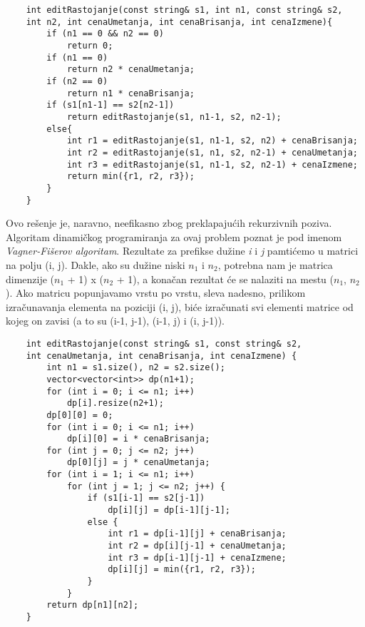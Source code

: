 \documentclass{article}
\begin{document}
\begin{lstlisting}
    int editRastojanje(const string& s1, int n1, const string& s2, 
    int n2, int cenaUmetanja, int cenaBrisanja, int cenaIzmene){
        if (n1 == 0 && n2 == 0)
            return 0;
        if (n1 == 0)
            return n2 * cenaUmetanja;
        if (n2 == 0)
            return n1 * cenaBrisanja;
        if (s1[n1-1] == s2[n2-1])
            return editRastojanje(s1, n1-1, s2, n2-1);
        else{
            int r1 = editRastojanje(s1, n1-1, s2, n2) + cenaBrisanja;
            int r2 = editRastojanje(s1, n1, s2, n2-1) + cenaUmetanja;
            int r3 = editRastojanje(s1, n1-1, s2, n2-1) + cenaIzmene;
            return min({r1, r2, r3});
        }
    }
\end{lstlisting}
Ovo rešenje je, naravno, neefikasno zbog preklapajućih rekurzivnih poziva. Algoritam dinamičkog programiranja za ovaj problem poznat je pod imenom
\textit{Vagner-Fišerov algoritam}. Rezultate za prefikse dužine \textit{i} i \textit{j} pamtićemo u matrici
na polju (i, j). Dakle, ako su dužine niski $n_1$ i $n_2$, potrebna nam je matrica
dimenzije ($n_1$ + 1) x ($n_2$ + 1), a konačan rezultat će se nalaziti na mestu ($n_1$, $n_2$). Ako
matricu popunjavamo vrstu po vrstu, sleva nadesno, prilikom izračunavanja
elementa na poziciji (i, j), biće izračunati svi elementi matrice od kojeg on zavisi
(a to su (i-1, j-1), (i-1, j) i (i, j-1)).
\begin{lstlisting}
    int editRastojanje(const string& s1, const string& s2,
    int cenaUmetanja, int cenaBrisanja, int cenaIzmene) {
        int n1 = s1.size(), n2 = s2.size();
        vector<vector<int>> dp(n1+1);
        for (int i = 0; i <= n1; i++)
            dp[i].resize(n2+1);
        dp[0][0] = 0;
        for (int i = 0; i <= n1; i++)
            dp[i][0] = i * cenaBrisanja;
        for (int j = 0; j <= n2; j++)
            dp[0][j] = j * cenaUmetanja;
        for (int i = 1; i <= n1; i++)
            for (int j = 1; j <= n2; j++) {
                if (s1[i-1] == s2[j-1])
                    dp[i][j] = dp[i-1][j-1];
                else {
                    int r1 = dp[i-1][j] + cenaBrisanja;
                    int r2 = dp[i][j-1] + cenaUmetanja;
                    int r3 = dp[i-1][j-1] + cenaIzmene;
                    dp[i][j] = min({r1, r2, r3});
                }
            }
        return dp[n1][n2];
    }
\end{lstlisting}
\end{document}
